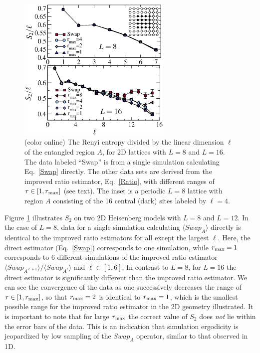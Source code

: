\documentclass[prl,aps,twocolumn,floatfix,amsmath,amssymb,superscriptaddress,tightenlines]{revtex4}
\begin{document}
\begin{figure} {
\includegraphics[width=2.9in]{L8n16_ratio.eps} \caption{(color online) 
\label{L16fig}
The Renyi entropy divided by the linear dimension $\ell$ of the entangled region $A$, for 2D lattices with $L=8$ and $L=16$.  The data labeled ``Swap'' is from a single simulation calculating Eq.~\eqref{Swap} directly.  The other
data sets are derived from the improved ratio estimator, Eq.~\eqref{Ratio}, with different ranges of $r \in [1,r_{\rm max}]$ (see text).  The inset 
is a periodic $L=8$ lattice with region $A$ consisting of the 16 central (dark) sites labeled by $\ell = 4$.
}
} \end{figure}

Figure \ref{L16fig} illustrates $S_2$ on two 2D Heisenberg models with  $L=8$ and  $L=12$.  In the case of $L=8$, data for a single 
simulation calculating $\langle Swap_A \rangle$ directly is identical to the improved ratio estimators for all except the largest $\ell$.  
Here, the direct estimator (Eq.~\eqref{Swap}) corresponds to one simulation, while $r_{\rm max}=1$ corresponds to 6 different simulations of the improved ratio estimator ${\langle Swap_{A^{\ell+1}}\rangle}/{\langle Swap_{A^{\ell}}\rangle}$ and $\ell \in [1,6]$.
In contrast to $L=8$, for $L=16$ the direct estimator is significantly different than 
the improved ratio estimator.  We can see the convergence of the data as one successively decreases the range of $r \in [1,r_{\rm max}]$, 
so that $r_{\rm max}=2$ is identical to $r_{\rm max}=1$, which is the smallest possible range for the improved ratio estimator in the 2D geometry illustrated.  It is important to note that for large $r_{\rm max}$ the correct value of $S_2$ does {\it not} lie within the error bars of the data.  
This is an indication that simulation ergodicity is jeopardized by low sampling of the $Swap_A$ operator, similar to that observed in 1D.
\end{document}
